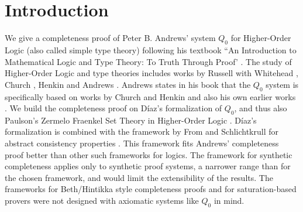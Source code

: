 \documentclass[10pt,a4paper]{article}
\begin{document}
\section{Introduction}
We give a completeness proof of Peter B. Andrews' system $Q_0$ for Higher-Order Logic (also called simple type theory) following 
his textbook ``An Introduction to Mathematical Logic and Type Theory: To Truth Through Proof' 
\cite{andrews2013introduction}.
The study of Higher-Order Logic and type theories includes works by Russell \cite{russell1908mathematical} with Whitehead \cite{whiteheadrussell}, Church \cite{church1940formulation}, 
Henkin \cite{henkin1950completeness,henkin1963b,DBLP:journals/bsl/Henkin96} and Andrews \cite{andrews1963reduction,andrews2013introduction,Andrews1971,andrews1972general}. 
Andrews states in his book that the $Q_0$ system is specifically based on works by Church \cite{church1940formulation} and Henkin \cite{henkin1950completeness,henkin1963b} and also his own earlier works \cite{andrews1963reduction,andrews1972general}.
We build the completeness proof on D\'iaz's \cite{Q0_Metatheory-AFP} formalization of $Q_0$, and thus 
also Paulson's Zermelo Fraenkel Set Theory in Higher-Order Logic \cite{ZFC_in_HOL-AFP}. D\'iaz's formalization is
combined with the framework by From and Schlichtkrull for abstract consistency properties \cite{Abstract_Consistency_Property-AFP,DBLP:conf/itp/FromS25}.
This framework fits Andrews' completeness proof better than other such frameworks for logics.
The framework for synthetic completeness \cite{Synthetic_Completeness-AFP,DBLP:conf/cpp/From25} applies only to synthetic proof systems, a narrower range than for the chosen framework, and would limit the extensibility of the results. 
The frameworks for Beth/Hintikka style completeness proofs \cite{Abstract_Completeness-AFP,DBLP:conf/cade/Blanchette0T14,DBLP:journals/jar/BlanchettePT17}
and for saturation-based provers \cite{Saturation_Framework-AFP,Splitting_Framework-AFP,DBLP:journals/jar/WaldmannTRB22,DBLP:conf/cade/EbnerBT21,DBLP:conf/cpp/TourretB21,Saturation_Framework_Extensions-AFP,DBLP:conf/cade/WaldmannTRB20} were not designed with axiomatic systems like $Q_0$ in mind.
\end{document}
